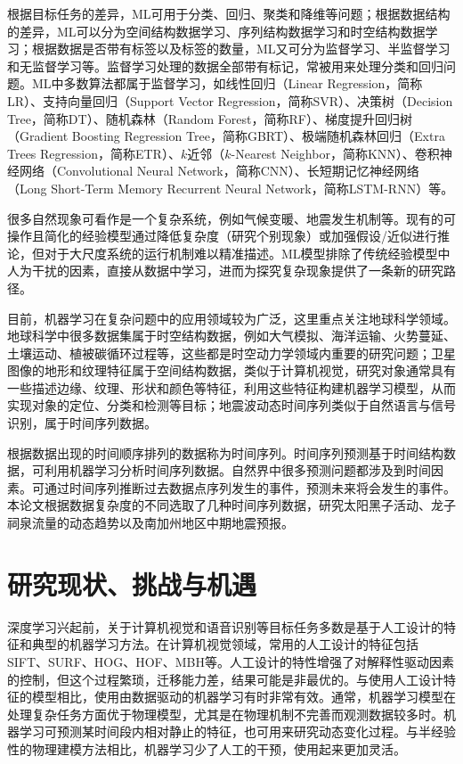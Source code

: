 根据目标任务的差异，ML可用于分类、回归、聚类和降维等问题；根据数据结构的差异，ML可以分为空间结构数据学习、序列结构数据学习和时空结构数据学习；根据数据是否带有标签以及标签的数量，ML又可分为监督学习、半监督学习和无监督学习等。监督学习处理的数据全部带有标记，常被用来处理分类和回归问题。ML中多数算法都属于监督学习，如线性回归（Linear Regression，简称LR）、支持向量回归（Support Vector Regression，简称SVR）、决策树（Decision Tree，简称DT）、随机森林（Random Forest，简称RF）、梯度提升回归树（Gradient Boosting Regression Tree，简称GBRT）、极端随机森林回归（Extra Trees Regression，简称ETR）、$k$近邻（$k$-Nearest Neighbor，简称KNN）、卷积神经网络（Convolutional Neural Network，简称CNN）、长短期记忆神经网络（Long Short-Term Memory Recurrent Neural Network，简称LSTM-RNN）等。

很多自然现象可看作是一个复杂系统，例如气候变暖、地震发生机制等\citep{fan2021statistical}。现有的可操作且简化的经验模型通过降低复杂度（研究个别现象）或加强假设/近似进行推论，但对于大尺度系统的运行机制难以精准描述。ML模型排除了传统经验模型中人为干扰的因素，直接从数据中学习，进而为探究复杂现象提供了一条新的研究路径。

目前，机器学习在复杂问题中的应用领域较为广泛，这里重点关注地球科学领域。地球科学中很多数据集属于时空结构数据，例如大气模拟、海洋运输、火势蔓延、土壤运动、植被碳循环过程等，这些都是时空动力学领域内重要的研究问题\citep{mathieu2015deep,oh2015action}；卫星图像的地形和纹理特征属于空间结构数据，类似于计算机视觉，研究对象通常具有一些描述边缘、纹理、形状和颜色等特征，利用这些特征构建机器学习模型，从而实现对象的定位、分类和检测等目标\citep{lee1990neural}；地震波动态时间序列类似于自然语言与信号识别，属于时间序列数据\citep{rouet2017machine,perol2018convolutional,devries2018deep}。

根据数据出现的时间顺序排列的数据称为时间序列。时间序列预测基于时间结构数据，可利用机器学习分析时间序列数据。自然界中很多预测问题都涉及到时间因素。可通过时间序列推断过去数据点序列发生的事件，预测未来将会发生的事件。本论文根据数据复杂度的不同选取了几种时间序列数据，研究太阳黑子活动、龙子祠泉流量的动态趋势以及南加州地区中期地震预报。

\section{研究现状、挑战与机遇}\label{sec:intro_veiw}

深度学习兴起前，关于计算机视觉和语音识别等目标任务多数是基于人工设计的特征和典型的机器学习方法。在计算机视觉领域，常用的人工设计的特征包括SIFT、SURF、HOG、HOF、MBH等。人工设计的特性增强了对解释性驱动因素的控制，但这个过程繁琐，迁移能力差，结果可能是非最优的。与使用人工设计特征的模型相比，使用由数据驱动的机器学习有时非常有效。通常，机器学习模型在处理复杂任务方面优于物理模型，尤其是在物理机制不完善而观测数据较多时。机器学习可预测某时间段内相对静止的特征，也可用来研究动态变化过程。与半经验性的物理建模方法相比，机器学习少了人工的干预，使用起来更加灵活。

